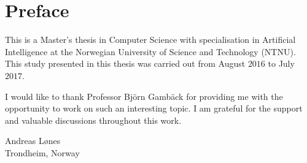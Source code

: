 \cleardoublepage
\chapter{Preface}


This is a Master's thesis in Computer Science with specialisation in Artificial Intelligence at the Norwegian University of Science and Technology (NTNU). This study presented in this thesis was carried out from August $2016$ to July $2017$.

I would like to thank Professor Bj\"orn Gamb\"ack for providing me with the opportunity to work on such an interesting topic. I am grateful for the support and valuable discussions throughout this work. 


\vspace{1.0cm}
\begin{flushright}
    Andreas Lønes      \\
    Trondheim, Norway \\
    \month~\year    \\
\end{flushright}